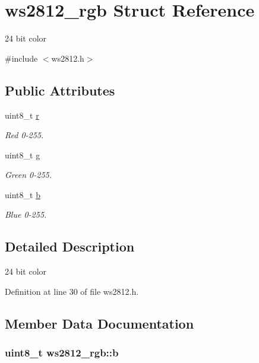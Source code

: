 \hypertarget{structws2812__rgb}{}\section{ws2812\+\_\+rgb Struct Reference}
\label{structws2812__rgb}


24 bit color  




{\ttfamily \#include $<$ws2812.\+h$>$}

\subsection*{Public Attributes}
\begin{DoxyCompactItemize}
\item 
uint8\+\_\+t \hyperlink{structws2812__rgb_accf7188c624788256477c2e4ee54515b}{r}
\begin{DoxyCompactList}\small\item\em Red 0-\/255. \end{DoxyCompactList}\item 
uint8\+\_\+t \hyperlink{structws2812__rgb_aaf5b0f4db796641e1cd16bd4f70fc7ac}{g}
\begin{DoxyCompactList}\small\item\em Green 0-\/255. \end{DoxyCompactList}\item 
uint8\+\_\+t \hyperlink{structws2812__rgb_ae6d6d19362a79c36178203b3123d2e7e}{b}
\begin{DoxyCompactList}\small\item\em Blue 0-\/255. \end{DoxyCompactList}\end{DoxyCompactItemize}


\subsection{Detailed Description}
24 bit color 

Definition at line 30 of file ws2812.\+h.



\subsection{Member Data Documentation}
\hypertarget{structws2812__rgb_ae6d6d19362a79c36178203b3123d2e7e}{}
\subsubsection[{b}]{\setlength{\rightskip}{0pt plus 5cm}uint8\+\_\+t ws2812\+\_\+rgb\+::b}\label{structws2812__rgb_ae6d6d19362a79c36178203b3123d2e7e}


